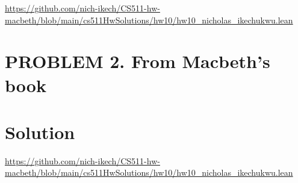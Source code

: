 \documentclass{article}
\begin{document}
\url{https://github.com/nich-ikech/CS511-hw-macbeth/blob/main/cs511HwSolutions/hw10/hw10_nicholas_ikechukwu.lean}

\newpage

\section*{PROBLEM 2. From Macbeth's book}
\section*{Solution}

\url{https://github.com/nich-ikech/CS511-hw-macbeth/blob/main/cs511HwSolutions/hw10/hw10_nicholas_ikechukwu.lean}
\end{document}

